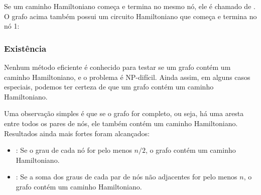 Se um caminho Hamiltoniano começa e termina no mesmo nó,
ele é chamado de .
O grafo acima também possui um circuito Hamiltoniano
que começa e termina no nó 1:
\begin{center}
\end{center}

\subsubsection{Existência}

Nenhum método eficiente é conhecido para testar se um grafo
contém um caminho Hamiltoniano, e o problema é NP-difícil.
Ainda assim, em alguns casos especiais, podemos ter certeza
de que um grafo contém um caminho Hamiltoniano.

Uma observação simples é que se o grafo for completo,
ou seja, há uma aresta entre todos os pares de nós,
ele também contém um caminho Hamiltoniano.
Resultados ainda mais fortes foram alcançados:

\begin{itemize}
\item
{}
: %
Se o grau de cada nó for pelo menos $n/2$,
o grafo contém um caminho Hamiltoniano.
\item
{}
: %
Se a soma dos graus de cada par de nós não adjacentes
for pelo menos $n$,
o grafo contém um caminho Hamiltoniano.
\end{itemize}

